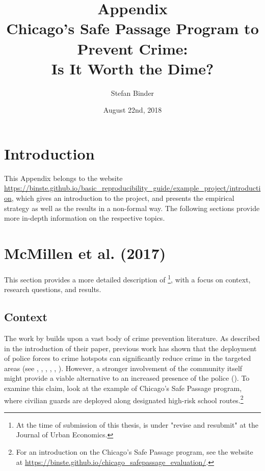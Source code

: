 \documentclass[]{article}
\title{\textsf{Appendix\\Chicago's Safe Passage Program to Prevent Crime: \\Is It Worth the Dime?}}
\author{\textsf{Stefan Binder}}
\date{August 22nd, 2018}
\begin{document}
\maketitle

\tableofcontents
\newpage
\section{Introduction}
This Appendix belongs to the website \url{https://binste.github.io/basic_reproducibility_guide/example_project/introduction}, which gives an introduction to the project, and presents the empirical strategy as well as the results in a non-formal way. The following sections provide more in-depth information on the respective topics.

\section{McMillen et al. (2017)}
This section provides a more detailed description of \cite{mcmillen2017}\footnote{At the time of submission of this thesis, \cite{mcmillen2017} is under "revise and resubmit" at the Journal of Urban Economics.}, with a focus on context, research questions, and results.

\subsection{Context}
The work by \cite{mcmillen2017} builds upon a vast body of crime prevention literature. As described in the introduction of their paper, previous work has shown that the deployment of police forces to crime hotspots can significantly reduce crime in the targeted areas (see \citealt{di2004police}, \citealt{klick2005using},  \citealt{draca2011panic}, \citealt{weisburd2009hot}, \citealt{braga2014effects}, \citealt{lum2014evidence}). However, a stronger involvement of the community itself might provide a viable alternative to an increased presence of the police (\citealt{krivo2014reducing}). To examine this claim, \cite{mcmillen2017} look at the example of Chicago's Safe Passage program, where civilian guards are deployed along designated high-risk school routes.\footnote{For an introduction on the Chicago's Safe Passage program, see the website at \url{https://binste.github.io/chicago_safepassage_evaluation/}.}
\end{document}
